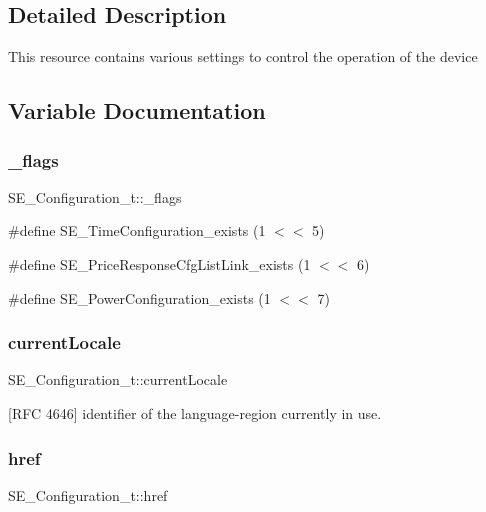 \subsection{Detailed Description}
This resource contains various settings to control the operation of the device 

\subsection{Variable Documentation}
\mbox{\label{group__Configuration_ga8a3ca98bd859b81b66d18b1e187c88d9}} 
\subsubsection{\texorpdfstring{\+\_\+flags}{\_flags}}
{\footnotesize\ttfamily S\+E\+\_\+\+Configuration\+\_\+t\+::\+\_\+flags}

\#define S\+E\+\_\+\+Time\+Configuration\+\_\+exists (1 $<$$<$ 5)

\#define S\+E\+\_\+\+Price\+Response\+Cfg\+List\+Link\+\_\+exists (1 $<$$<$ 6)

\#define S\+E\+\_\+\+Power\+Configuration\+\_\+exists (1 $<$$<$ 7) \mbox{\label{group__Configuration_gae45efe46ca71698cd46e1517aa7e8bae}} 
\subsubsection{\texorpdfstring{current\+Locale}{currentLocale}}
{\footnotesize\ttfamily S\+E\+\_\+\+Configuration\+\_\+t\+::current\+Locale}

\mbox{[}R\+FC 4646\mbox{]} identifier of the language-\/region currently in use. \mbox{\label{group__Configuration_ga4e903b7cfa2e74aa671801bcb604387b}} 
\subsubsection{\texorpdfstring{href}{href}}
{\footnotesize\ttfamily S\+E\+\_\+\+Configuration\+\_\+t\+::href}


